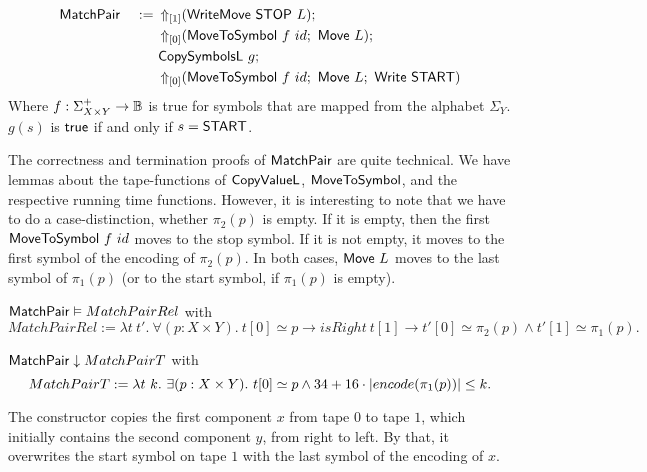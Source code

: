 %
\begin{definition}[$\MS{MatchPair}$][MatchPair]
  \label{def:MatchPair}
  ~
  \begin{alignat*}{2}
    &\MS{MatchPair}&~:=~& \LiftTapes{(\MS{WriteMove}~\MS{STOP}~L)}{\Vector{1}} \Seq \\
    &              &    & \LiftTapes{(\MS{MoveToSymbol}~f~id \Seq \MS{Move}~L)}{\Vector{0}} \Seq \\
    &              &    & \MS{CopySymbolsL}~g\Seq \\
    &              &    & \LiftTapes{(\MS{MoveToSymbol}~f~id \Seq \MS{Move}~L \Seq \MS{Write}~\MS{START})}{\Vector{0}}
  \end{alignat*}
  Where $f : \Sigma_{X \times Y}^+ \to \Bool$ is true for symbols that are mapped from the alphabet $\Sigma_Y$.  $g(s)$ is $\true$ if and only if
  $s=\MS{START}$.
\end{definition}

The correctness and termination proofs of $\MS{MatchPair}$ are quite technical.  We have lemmas about the tape-functions of $\MS{CopyValueL}$,
$\MS{MoveToSymbol}$, and the respective running time functions.  However, it is interesting to note that we have to do a case-distinction, whether
$\pi_2(p)$ is empty.  If it is empty, then the first $\MS{MoveToSymbol}~f~id$ moves to the stop symbol.  If it is not empty, it moves to the first
symbol of the encoding of $\pi_2(p)$.  In both cases, $\MS{Move}~L$ moves to the last symbol of $\pi_1(p)$ (or to the start symbol, if $\pi_1(p)$ is
empty).

\begin{lemma}
  \label{lem:MatchPair_Realise}
  $\MS{MatchPair} \Realise MatchPairRel$ with
  \small
  \[
    MatchPairRel := \lambda t~t'.~\forall (p: X \times Y).~t[0] \simeq p \rightarrow isRight~t[1] \rightarrow t'[0] \simeq \pi_2(p) \land t'[1] \simeq \pi_1(p).
  \]
\end{lemma}
\begin{lemma}
  \label{lem:MatchPair_TerminatesIn}
  $\MS{MatchPair} \TerminatesIn MatchPairT$ with
  \[
    MatchPairT := \lambda t~k.~\exists (p: X \times Y).~t[0] \simeq p \land 34 + 16 \cdot \size{\pi_1(p)} \leq k.
  \]
\end{lemma}

The constructor copies the first component $x$ from tape $0$ to tape $1$, which initially contains the second component $y$, from right to left.  By
that, it overwrites the start symbol on tape $1$ with the last symbol of the encoding of $x$.

